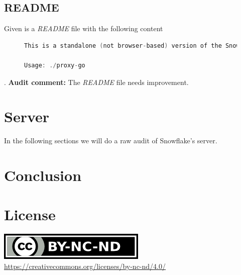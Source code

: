 \documentclass{amsart}
\theoremstyle{definition}
\theoremstyle{remark}
\numberwithin{equation}{section}
\begin{document}
\subsection{README}
\label{ss:proxygoreadme}
Given is a \textit{README} file \cite{SnowflakeGitProxyGo} with the following content

\begin{figure}[H]
\begin{lstlisting}[frame=single, language=C, caption=proxy-go README]
This is a standalone (not browser-based) version of the Snowflake proxy.

Usage: ./proxy-go
\end{lstlisting}
\label{fig:proxygoreadme}
\end{figure}
. \textbf{Audit comment:} The \textit{README} file needs improvement.
\section{Server}
\label{s:server}
In the following sections we will do a raw audit of Snowflake's server.
\section{Conclusion}
\label{s:conclusion}
\nocite{*}
%


\section*{License}
\label{s:license}
\begin{center}
	\includegraphics{by-nc-nd.png} \\
	\url{https://creativecommons.org/licenses/by-nc-nd/4.0/}
\end{center}
\end{document}
